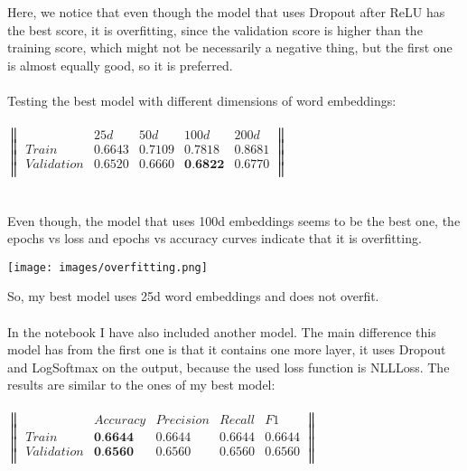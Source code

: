 \documentclass{article}
\begin{document}
Here, we notice that even though the model that uses Dropout after ReLU has the best score, it is overfitting, since the validation score is higher than the training score, which might not be necessarily a negative thing, but the first one is almost equally good, so it is preferred. \\ \\
Testing the best model with different dimensions of word embeddings: \\ \\
$
\begin{Vmatrix}
& 25d & 50d & 100d & 200d\\
Train & 0.6643 & 0.7109 & 0.7818 & 0.8681\\
Validation & 0.6520 & 0.6660 & \textbf{0.6822} & 0.6770\\
\end{Vmatrix} 
$ \\ \\ \\
Even though, the model that uses 100d embeddings seems to be the best one, the epochs vs loss and epochs vs accuracy curves indicate that it is overfitting.
\begin{center}
\texttt{[image: images/overfitting.png]}
\end{center}
So, my best model uses 25d word embeddings and does not overfit. \\ \\

In the notebook I have also included another model. The main difference this model has from the first one is that it contains one more layer, it uses Dropout and LogSoftmax on the output, because the used loss function is NLLLoss. The results are similar to the ones of my best model: \\ \\
$
\begin{Vmatrix}
& Accuracy & Precision &  Recall & F1\\
Train & \textbf{0.6644} & 0.6644 & 0.6644 & 0.6644\\
Validation & \textbf{0.6560} & 0.6560 & 0.6560 & 0.6560\\
\end{Vmatrix} 
$ \\ \\ \\
\end{document}
